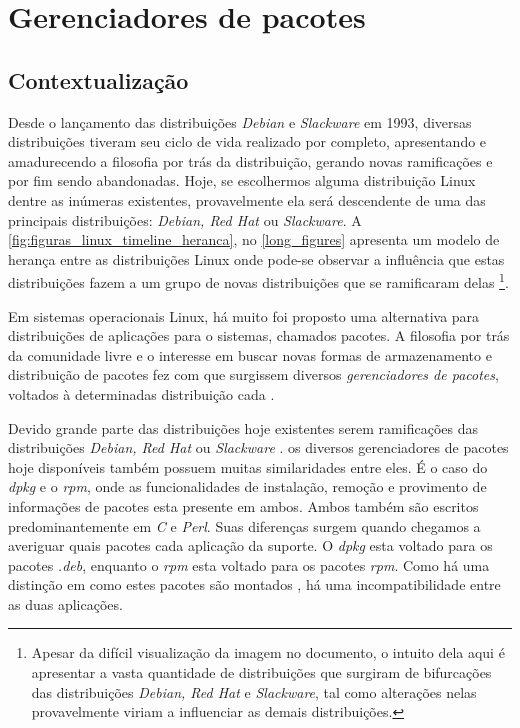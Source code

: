 \section{Gerenciadores de pacotes} %
\label{sec:distribui_es_abordadas}

\subsection{Contextualização} %
\label{sec:breve_descri_o}

Desde o lançamento das distribuições \textit{Debian} e \textit{Slackware} em 1993, diversas distribuições tiveram seu ciclo de vida realizado por completo, apresentando e amadurecendo a filosofia por trás da distribuição, gerando novas ramificações e por fim sendo abandonadas. Hoje, se escolhermos alguma distribuição Linux dentre as inúmeras existentes, provavelmente ela será descendente de uma das principais distribuições: \textit{Debian, Red Hat} ou \textit{Slackware}. %
A \autoref{fig:figuras_linux_timeline_heranca}, no \autoref{long_figures} apresenta um modelo de herança entre as distribuições Linux onde pode-se observar a influência que estas distribuições fazem a um grupo de novas distribuições que se ramificaram delas%
\footnote{Apesar da difícil visualização da imagem no documento, o intuito dela aqui é apresentar a vasta quantidade de distribuições que surgiram de bifurcações das distribuições \textit{Debian, Red Hat} e \textit{Slackware}, tal como alterações nelas provavelmente viriam a influenciar as demais distribuições.}.

Em sistemas operacionais Linux, há muito foi proposto uma alternativa para distribuições de aplicações para o sistemas, chamados pacotes. A filosofia por trás da comunidade livre \cite{bretthauer2001open} e o interesse em buscar novas formas de armazenamento e distribuição de pacotes fez com que surgissem diversos \textit{gerenciadores de pacotes}, voltados à determinadas distribuição  cada \cite{beck2002linux}.

Devido grande parte das distribuições hoje existentes serem ramificações das distribuições \textit{Debian, Red Hat} ou \textit{Slackware} 
.%
os diversos gerenciadores de pacotes hoje disponíveis também possuem muitas similaridades entre eles.
É o caso do \textit{dpkg} e o \textit{rpm}, onde as funcionalidades de instalação, remoção e provimento de informações de pacotes esta presente em ambos. Ambos também são escritos predominantemente em \textit{C} e \textit{Perl}. Suas diferenças surgem quando chegamos a averiguar quais pacotes cada aplicação da suporte. O \textit{dpkg} esta voltado para os pacotes \textit{.deb}, enquanto o \textit{rpm} esta voltado para os pacotes \textit{rpm}. Como há uma distinção em como estes pacotes são montados \cite{bailey1997maximum}, há uma incompatibilidade entre as duas aplicações. 

